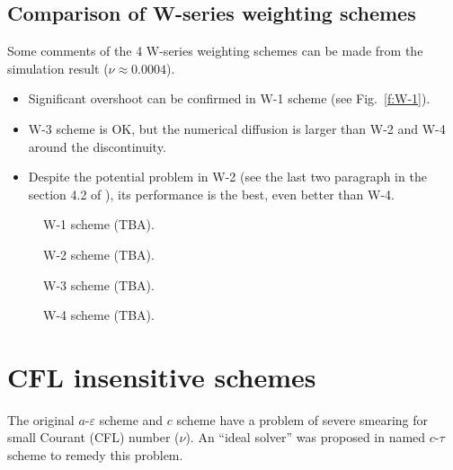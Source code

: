 \documentclass[11pt,dvips]{article}
\renewcommand{\figurename}{Fig.}
\numberwithin{equation}{section}
\begin{document}
\subsection{Comparison of W-series weighting schemes}

Some comments of the 4 W-series weighting schemes can be made from the
simulation result ($\nu\approx0.0004$).
\begin{itemize}
  \item Significant overshoot can be
        confirmed \citep{chang_multi-dimensional_2003} in W-1 scheme (see
        \figurename~\ref{f:W-1}).
  \item W-3 scheme is OK, but the numerical diffusion is larger than W-2 and
        W-4 around the discontinuity.
  \item Despite the potential problem in W-2 (see the last two paragraph in the
        section 4.2 of \citep{chang_multi-dimensional_2003}), its performance is
        the best, even better than W-4.
\end{itemize}

\begin{figure}[htbp]
  \centering
  \caption{W-1 scheme (TBA).}
  \label{f:W-1}
  \caption{W-2 scheme (TBA).}
  \label{f:W-2}
\end{figure}

\begin{figure}[htbp]
  \centering
  \caption{W-3 scheme (TBA).}
  \label{f:W-3}
  \caption{W-4 scheme (TBA).}
  \label{f:W-4}
\end{figure}

\section{CFL insensitive schemes}
\label{s:ctau}

The original $a$-$\varepsilon$ scheme and $c$ scheme have a problem of severe
smearing for small Courant (CFL) number ($\nu$).  An ``ideal solver'' was
proposed in \citep{chang_multi-dimensional_2003} named $c$-$\tau$ scheme to
remedy this problem.
\end{document}
